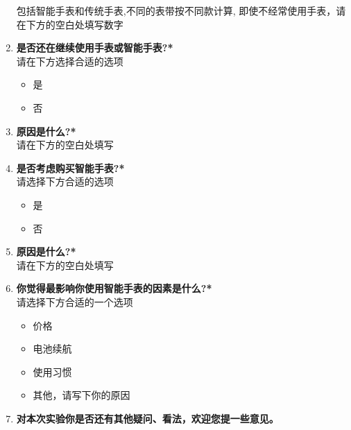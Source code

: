 \begin{enumerate}
      包括智能手表和传统手表,不同的表带按不同款计算, 即使不经常使用手表，请在下方的空白处填写数字
      \item \textbf{是否还在继续使用手表或智能手表?*}\\
      请在下方选择合适的选项
      \begin{itemize}
          \item 是
          \item 否
      \end{itemize}
      \item \textbf{原因是什么?*}\\
      请在下方的空白处填写
      \item \textbf{是否考虑购买智能手表?*}\\
      请选择下方合适的选项
      \begin{itemize}
          \item 是
          \item 否
      \end{itemize}
      \item \textbf{原因是什么?*}\\
      请在下方的空白处填写
      \item \textbf{你觉得最影响你使用智能手表的因素是什么?*}\\
      请选择下方合适的一个选项
      \begin{itemize}
          \item 价格
          \item 电池续航
          \item 使用习惯
          \item 其他，请写下你的原因
      \end{itemize}
      \item \textbf{对本次实验你是否还有其他疑问、看法，欢迎您提一些意见。}\\
  \end{enumerate}
